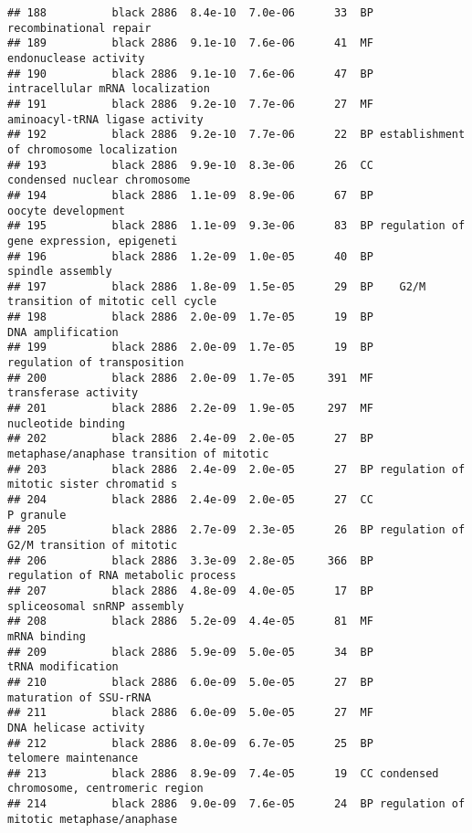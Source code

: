 \documentclass[]{article}
\begin{document}
\begin{verbatim}
## 188          black 2886  8.4e-10  7.0e-06      33  BP                   recombinational repair
## 189          black 2886  9.1e-10  7.6e-06      41  MF                    endonuclease activity
## 190          black 2886  9.1e-10  7.6e-06      47  BP          intracellular mRNA localization
## 191          black 2886  9.2e-10  7.7e-06      27  MF           aminoacyl-tRNA ligase activity
## 192          black 2886  9.2e-10  7.7e-06      22  BP establishment of chromosome localization
## 193          black 2886  9.9e-10  8.3e-06      26  CC             condensed nuclear chromosome
## 194          black 2886  1.1e-09  8.9e-06      67  BP                       oocyte development
## 195          black 2886  1.1e-09  9.3e-06      83  BP regulation of gene expression, epigeneti
## 196          black 2886  1.2e-09  1.0e-05      40  BP                         spindle assembly
## 197          black 2886  1.8e-09  1.5e-05      29  BP    G2/M transition of mitotic cell cycle
## 198          black 2886  2.0e-09  1.7e-05      19  BP                        DNA amplification
## 199          black 2886  2.0e-09  1.7e-05      19  BP              regulation of transposition
## 200          black 2886  2.0e-09  1.7e-05     391  MF                     transferase activity
## 201          black 2886  2.2e-09  1.9e-05     297  MF                       nucleotide binding
## 202          black 2886  2.4e-09  2.0e-05      27  BP metaphase/anaphase transition of mitotic
## 203          black 2886  2.4e-09  2.0e-05      27  BP regulation of mitotic sister chromatid s
## 204          black 2886  2.4e-09  2.0e-05      27  CC                                P granule
## 205          black 2886  2.7e-09  2.3e-05      26  BP regulation of G2/M transition of mitotic
## 206          black 2886  3.3e-09  2.8e-05     366  BP      regulation of RNA metabolic process
## 207          black 2886  4.8e-09  4.0e-05      17  BP              spliceosomal snRNP assembly
## 208          black 2886  5.2e-09  4.4e-05      81  MF                             mRNA binding
## 209          black 2886  5.9e-09  5.0e-05      34  BP                        tRNA modification
## 210          black 2886  6.0e-09  5.0e-05      27  BP                   maturation of SSU-rRNA
## 211          black 2886  6.0e-09  5.0e-05      27  MF                    DNA helicase activity
## 212          black 2886  8.0e-09  6.7e-05      25  BP                     telomere maintenance
## 213          black 2886  8.9e-09  7.4e-05      19  CC condensed chromosome, centromeric region
## 214          black 2886  9.0e-09  7.6e-05      24  BP regulation of mitotic metaphase/anaphase

\end{verbatim}
\end{document}
